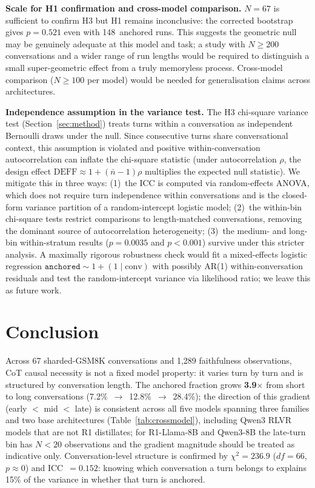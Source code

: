 \documentclass{article}
\begin{document}
\textbf{Scale for H1 confirmation and cross-model comparison.}
$N = 67$ is sufficient to confirm H3 but H1 remains inconclusive:
the corrected bootstrap gives $p = 0.521$ even with 148~anchored
runs.
This suggests the geometric null may be genuinely adequate at this
model and task; a study with $N \geq 200$ conversations and a
wider range of run lengths would be required to distinguish
a small super-geometric effect from a truly memoryless process.
Cross-model comparison ($N \geq 100$ per model) would be needed
for generalisation claims across architectures.

\textbf{Independence assumption in the variance test.}
The H3 chi-square variance test (Section~\ref{sec:method}) treats
turns within a conversation as independent Bernoulli draws under
the null.
Since consecutive turns share conversational context, this
assumption is violated and positive within-conversation
autocorrelation can inflate the chi-square statistic
(under autocorrelation $\rho$, the design effect
$\mathrm{DEFF}\approx 1+(\bar{n}-1)\rho$ multiplies the
expected null statistic).
We mitigate this in three ways: (1)~the ICC is computed via
random-effects ANOVA, which does not require turn independence
within conversations and is the closed-form variance partition
of a random-intercept logistic model; (2)~the within-bin
chi-square tests restrict comparisons to length-matched
conversations, removing the dominant source of autocorrelation
heterogeneity; (3)~the medium- and long-bin within-stratum
results ($p=0.0035$ and $p<0.001$) survive under this stricter
analysis.
A maximally rigorous robustness check would fit a mixed-effects
logistic regression
$\texttt{anchored} \sim 1 + (1\mid\mathrm{conv})$ with possibly
AR(1) within-conversation residuals and test the random-intercept
variance via likelihood ratio; we leave this as future work.

\section{Conclusion}
\label{sec:conclusion}

Across 67 sharded-GSM8K conversations and 1,289 faithfulness
observations, CoT causal necessity is not a fixed model property:
it varies turn by turn and is structured by conversation length.
The anchored fraction grows \textbf{3.9$\times$} from short to
long conversations (7.2\%~$\to$~12.8\%~$\to$~28.4\%); the
direction of this gradient (early $<$ mid $<$ late) is consistent
across all five models spanning three families and two base
architectures (Table~\ref{tab:crossmodel}), including Qwen3
RLVR models that are not R1 distillates; for R1-Llama-8B and
Qwen3-8B the late-turn bin has $N{<}20$ observations and the
gradient magnitude should be treated as indicative only.
Conversation-level structure is confirmed by $\chi^2 = 236.9$
($df=66$, $p\approx 0$) and ICC~$=0.152$: knowing which
conversation a turn belongs to explains 15\% of the variance in
whether that turn is anchored.
\end{document}
